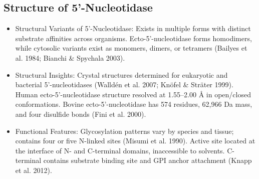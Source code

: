 \subsection*{Structure of 5'-Nucleotidase}
\begin{itemize}
    \item Structural Variants of 5’-Nucleotidase:
    \subitem Exists in multiple forms with distinct substrate affinities across organisms.
    \subitem Ecto-5’-nucleotidase forms homodimers, while cytosolic variants exist as monomers, dimers, or tetramers (Bailyes et al. 1984; Bianchi \& Spychala 2003).

    \item Structural Insights:
    \subitem Crystal structures determined for eukaryotic and bacterial 5’-nucleotidases (Walldén et al. 2007; Knöfel \& Sträter 1999).
    \subitem Human ecto-5’-nucleotidase structure resolved at 1.55–2.00 Å in open/closed conformations.
    \subitem Bovine ecto-5’-nucleotidase has 574 residues, 62,966 Da mass, and four disulfide bonds (Fini et al. 2000).

    \item Functional Features:
    \subitem Glycosylation patterns vary by species and tissue; contains four or five N-linked sites (Misumi et al. 1990).
    \subitem Active site located at the interface of N- and C-terminal domains, inaccessible to solvents.
    \subitem C-terminal contains substrate binding site and GPI anchor attachment (Knapp et al. 2012).
\end{itemize}

